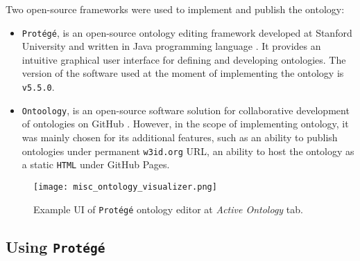 Two open-source frameworks were used to implement and publish the \lpas{} ontology:
\begin{itemize}
    \item \texttt{Protégé}, is an open-source ontology editing framework developed at Stanford University and written in Java programming language \cite{protege}. It provides an intuitive graphical user interface for defining and developing ontologies. The version of the software used at the moment of implementing the ontology is \texttt{v5.5.0}.
    \item \texttt{Ontoology}, is an open-source software solution for collaborative development of ontologies on GitHub \cite{ontoology}. However, in the scope of implementing \lpas{} ontology, it was mainly chosen for its additional features, such as an ability to publish ontologies under permanent \texttt{w3id.org} URL, an ability to host the ontology as a static \texttt{HTML} under GitHub Pages. 
\end{itemize}

\begin{figure}[h]
\centering
\texttt{[image: misc\_ontology\_visualizer.png]}
\caption{Example UI of \texttt{Protégé} ontology editor at \textit{Active Ontology} tab.}
\label{fig:misc_ontology_visualizer}
\end{figure}

\subsection{Using \texttt{Protégé}}

